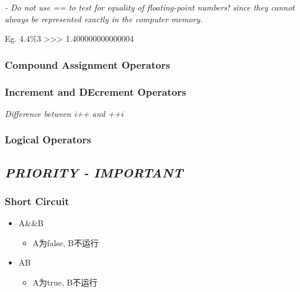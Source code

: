 \documentclass[
  paper=a4,
  ,captions=tableheading
]{scrartcl}
\providecommand{\tightlist}{%
  \setlength{\itemsep}{0pt}\setlength{\parskip}{0pt}}
\begin{document}
\emph{- Do not use == to test for equality of floating-point numbers!
since they cannot always be represented exactly in the computer memory.}

Eg. 4.4\%3 \textgreater{}\textgreater{}\textgreater{} 1.400000000000004

\hypertarget{compound-assignment-operators}{%
\subsubsection{Compound Assignment
Operators}\label{compound-assignment-operators}}

\hypertarget{increment-and-decrement-operators}{%
\subsubsection{Increment and DEcrement
Operators}\label{increment-and-decrement-operators}}

\emph{Difference between i++ and ++i}

\hypertarget{logical-operators}{%
\subsubsection{Logical Operators}\label{logical-operators}}

\hypertarget{priority---important}{%
\subsection{\texorpdfstring{\emph{PRIORITY -
IMPORTANT}}{PRIORITY - IMPORTANT}}\label{priority---important}}

\hypertarget{short-circuit}{%
\subsubsection{Short Circuit}\label{short-circuit}}

\begin{itemize}
\item
  A\&\&B

  \begin{itemize}
  \tightlist
  \item
    A为false, B不运行
  \end{itemize}
\item
  A\textbar{}\textbar{}B

  \begin{itemize}
  \tightlist
  \item
    A为true, B不运行
  \end{itemize}
\end{itemize}
\end{document}
